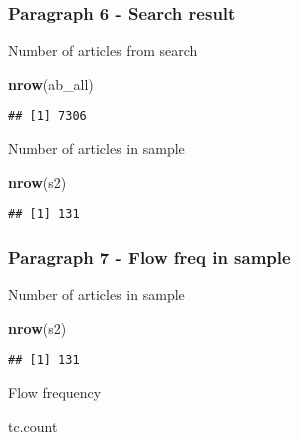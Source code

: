 \documentclass[
]{article}
\newenvironment{Shaded}{\begin{snugshade}}{\end{snugshade}}
\newcommand{\KeywordTok}[1]{\textcolor[rgb]{0.13,0.29,0.53}{\textbf{#1}}}
\newcommand{\NormalTok}[1]{#1}
\begin{document}
\hypertarget{paragraph-6---search-result}{%
\subsubsection{Paragraph 6 - Search
result}\label{paragraph-6---search-result}}

Number of articles from search

\begin{Shaded}
\begin{Highlighting}[]
\KeywordTok{nrow}\NormalTok{(ab_all) }
\end{Highlighting}
\end{Shaded}

\begin{verbatim}
## [1] 7306
\end{verbatim}

Number of articles in sample

\begin{Shaded}
\begin{Highlighting}[]
\KeywordTok{nrow}\NormalTok{(s2) }
\end{Highlighting}
\end{Shaded}

\begin{verbatim}
## [1] 131
\end{verbatim}

\hypertarget{paragraph-7---flow-freq-in-sample}{%
\subsubsection{Paragraph 7 - Flow freq in
sample}\label{paragraph-7---flow-freq-in-sample}}

Number of articles in sample

\begin{Shaded}
\begin{Highlighting}[]
\KeywordTok{nrow}\NormalTok{(s2)}
\end{Highlighting}
\end{Shaded}

\begin{verbatim}
## [1] 131
\end{verbatim}

Flow frequency

\begin{Shaded}
\begin{Highlighting}[]
\NormalTok{tc.count}
\end{Highlighting}
\end{Shaded}
\end{document}
